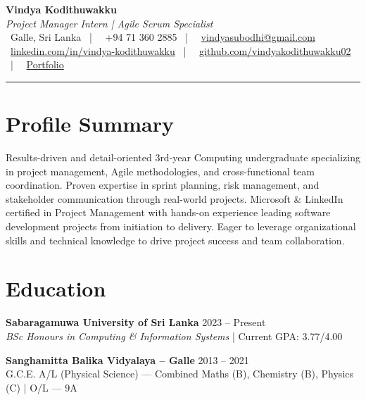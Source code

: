 \documentclass[letterpaper,10pt]{article}
\begin{document}
\begin{center}
{\Huge\color{accentTitle}\textbf{Vindya Kodithuwakku}}\\[3pt]
{\large\textit{Project Manager Intern | Agile Scrum Specialist}}\\[4pt]
\faMapMarker*~Galle, Sri Lanka ~|~
\faPhone~+94 71 360 2885 ~|~
\faEnvelope~\href{mailto:vindyasubodhi@gmail.com}{vindyasubodhi@gmail.com}\\[1pt]
\faLinkedin~\href{https://www.linkedin.com/in/vindya-kodithuwakku-bb6187202}{linkedin.com/in/vindya-kodithuwakku} ~|~
\faGithub~\href{https://github.com/vindyakodithuwakku02}{github.com/vindyakodithuwakku02} ~|~
\faGlobe~\href{https://vindyakodithuwakku.github.io/portfolio}{Portfolio}\\[4pt]
{\color{accentLine}\hrule}
\end{center}

\section{Profile Summary}
\vspace{-1pt}
Results-driven and detail-oriented 3rd-year Computing undergraduate specializing in project management, Agile methodologies, and cross-functional team coordination. Proven expertise in sprint planning, risk management, and stakeholder communication through real-world projects. Microsoft \& LinkedIn certified in Project Management with hands-on experience leading software development projects from initiation to delivery. Eager to leverage organizational skills and technical knowledge to drive project success and team collaboration.

\section{Education}
\vspace{-1pt}

\textbf{Sabaragamuwa University of Sri Lanka} \hfill 2023 – Present\\
\textit{BSc Honours in Computing \& Information Systems} | Current GPA: 3.77/4.00

\vspace{2pt}
\textbf{Sanghamitta Balika Vidyalaya – Galle} \hfill 2013 – 2021\\
G.C.E. A/L (Physical Science) — Combined Maths (B), Chemistry (B), Physics (C) | O/L — 9A
\end{document}
